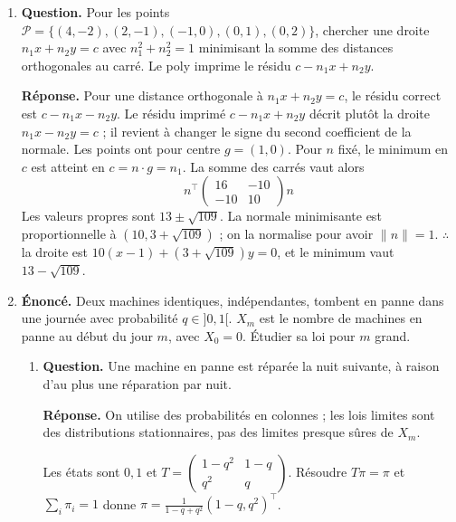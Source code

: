 \documentclass[12pt, a4paper]{article}
\begin{document}
\begin{enumerate}[label=9.\arabic*., start=94]
\begin{minipage}[t]{\linewidth}
\begin{enumerate}[\arabic*.]
\end{enumerate}
\end{minipage}

  \item \begin{minipage}[t]{\linewidth}\raggedright
\textbf{Question.} Pour les points $\mathcal P=\{(4,-2),(2,-1),(-1,0),(0,1),(0,2)\}$, chercher une droite $n_1x+n_2y=c$ avec $n_1^2+n_2^2=1$ minimisant la somme des distances orthogonales au carré. Le poly imprime le résidu $c-n_1x+n_2y$.
\par\smallskip
\textbf{Réponse.} Pour une distance orthogonale à $n_1x+n_2y=c$, le résidu correct est $c-n_1x-n_2y$.
    Le résidu imprimé $c-n_1x+n_2y$ décrit plutôt la droite $n_1x-n_2y=c$ ; il revient à changer le signe du second coefficient de la normale.
    Les points ont pour centre $g=(1,0)$.
    Pour $n$ fixé, le minimum en $c$ est atteint en $c=n\cdot g=n_1$.
    La somme des carrés vaut alors
    \[
      n^\top\begin{pmatrix}16&-10\\-10&10\end{pmatrix}n
    \]
    Les valeurs propres sont $13\pm\sqrt{109}$.
    La normale minimisante est proportionnelle à $(10,3+\sqrt{109})$ ; on la normalise pour avoir $\|n\|=1$.
    $\therefore$ la droite est $10(x-1)+(3+\sqrt{109})y=0$, et le minimum vaut $13-\sqrt{109}$.
\end{minipage}

  \item \begin{minipage}[t]{\linewidth}\raggedright
\textbf{Énoncé.} Deux machines identiques, indépendantes, tombent en panne dans une journée avec probabilité $q\in]0,1[$. $X_m$ est le nombre de machines en panne au début du jour $m$, avec $X_0=0$. Étudier sa loi pour $m$ grand.

\begin{enumerate}[\arabic*.]
        \item \textbf{Question.} Une machine en panne est réparée la nuit suivante, à raison d’au plus une réparation par nuit.
\par\smallskip
\textbf{Réponse.} On utilise des probabilités en colonnes ; les lois limites sont des distributions stationnaires, pas des limites presque sûres de $X_m$.

Les états sont $0,1$ et
        $\displaystyle T=\begin{pmatrix}1-q^2&1-q\\q^2&q\end{pmatrix}$.
        Résoudre $T\pi=\pi$ et $\sum_i\pi_i=1$ donne
        $\displaystyle\pi=\frac1{1-q+q^2}(1-q,q^2)^\top$.


\end{enumerate}
\end{minipage}
\end{enumerate}
\end{document}
